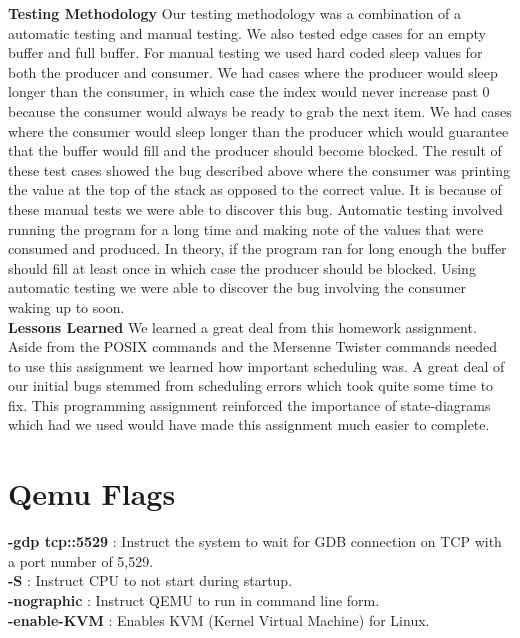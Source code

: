 \documentclass[letterpaper,10pt,draftclsnofoot,titlepage,onecolumn]{IEEEtran}
\begin{document}
	\textbf{Testing Methodology} 
		Our testing methodology was a combination of a automatic testing and manual testing. We also tested edge cases for an empty buffer and full buffer.
		For manual testing we used hard coded sleep values for both the producer and consumer. We had cases where the producer would sleep longer than the consumer,
		in which case the index would never increase past 0 because the consumer would always be ready to grab the next item. We had cases where the consumer would
		sleep longer than the producer which would guarantee that the buffer would fill and the producer should become blocked. The result of these test cases showed
		the bug described above where the consumer was printing the value at the top of the stack as opposed to the correct value. It is because of these manual tests
		we were able to discover this bug. Automatic testing involved running the program for a long time and making note of the values that were consumed and produced.
		In theory, if the program ran for long enough the buffer should fill at least once in which case the producer should be blocked. Using automatic testing we
		were able to discover the bug involving the consumer waking up to soon.\\ 

	\textbf{Lessons Learned}
		We learned a great deal from this homework assignment. Aside from the POSIX commands and the Mersenne Twister commands needed to use this assignment we
		learned how important scheduling was. A great deal of our initial bugs stemmed from scheduling errors which took quite some time to fix. This programming
		assignment reinforced the importance of state-diagrams which had we used would have made this assignment much easier to complete.\\ 

	
	\clearpage
	\section{Qemu Flags}
	\textbf{-gdp tcp::5529} : Instruct the system to wait for GDB connection on TCP with a port number of 5,529. \\
	
	\textbf{-S} : Instruct CPU to not start during startup. \\
	
	\textbf{-nographic} : Instruct QEMU to run in command line form. \\
	
	\textbf{-enable-KVM} : Enables KVM (Kernel Virtual Machine) for Linux. \\
	
\end{document}
